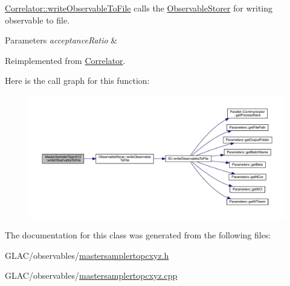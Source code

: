 \mbox{\hyperlink{class_correlator_a9e8d80e30e4fbe3b7fe57521538cb5ff}{Correlator\+::write\+Observable\+To\+File}} calls the \mbox{\hyperlink{class_observable_storer}{Observable\+Storer}} for writing observable to file. 


\begin{DoxyParams}{Parameters}
{\em acceptance\+Ratio} & \\
\hline
\end{DoxyParams}


Reimplemented from \mbox{\hyperlink{class_correlator_a9e8d80e30e4fbe3b7fe57521538cb5ff}{Correlator}}.

Here is the call graph for this function\+:
\nopagebreak
\begin{figure}[H]
\begin{center}
\leavevmode
\includegraphics[width=350pt]{class_master_sampler_topc_x_y_z_a930f13a2a13f4b3820f40c8b52110cf2_cgraph}
\end{center}
\end{figure}


The documentation for this class was generated from the following files\+:\begin{DoxyCompactItemize}
\item 
G\+L\+A\+C/observables/\mbox{\hyperlink{mastersamplertopcxyz_8h}{mastersamplertopcxyz.\+h}}\item 
G\+L\+A\+C/observables/\mbox{\hyperlink{mastersamplertopcxyz_8cpp}{mastersamplertopcxyz.\+cpp}}\end{DoxyCompactItemize}
